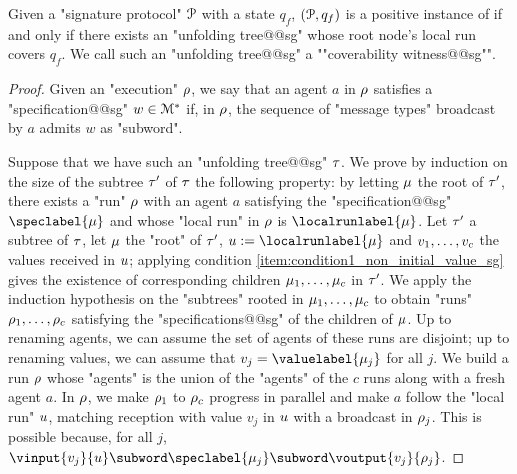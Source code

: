 \begin{lemma}
\label{lem:coverability_witness_sg}
Given a "signature protocol" $\mathcal{P}$ with a state $q_f$, $(\mathcal{P},q_f)$ is a positive instance of \COVER if and only if there exists an "unfolding tree@@sg" whose root node's local run covers $q_f$. We call such an "unfolding tree@@sg" a ""coverability witness@@sg"".
\end{lemma}
\begin{proof}
Given an "execution" $\rho$, we say that an agent $a$ in $\rho$ satisfies a "specification@@sg" $w \in \mathcal{M}^*$ if, in $\rho$, the sequence of "message types" broadcast by $a$ admits $w$ as "subword".%

Suppose that we have such an "unfolding tree@@sg" $\tau$. We prove by induction on the size of the subtree $\tau'$ of $\tau$ the following property: by letting $\mu$ the root of $\tau'$, there exists a "run" $\rho$ with an agent $a$ satisfying the "specification@@sg" $\speclabel{\node}$ and whose "local run" in $\rho$ is $\localrunlabel{\node}$. Let $\tau'$ a subtree of $\tau$, let $\mu$ the "root" of $\tau'$, $\localrun := \localrunlabel{\node}$ and $v_1, \dots, v_c$ the values received in $u$; applying condition \ref{item:condition1_non_initial_value_sg} gives the existence of corresponding children $\mu_1, \dots, \mu_c$ in $\tau'$. We apply the induction hypothesis on the "subtrees" rooted in $\mu_1, \dots, \mu_c$ to obtain "runs" $\rho_1, \dots, \rho_c$ satisfying the "specifications@@sg" of the children of $\mu$. Up to renaming agents, we can assume the set of agents of these runs are disjoint; up to renaming values, we can assume that $\aval_j = \valuelabel{\node_j}$ for all $j$. We build a run $\rho$ whose "agents" is the union of the "agents" of the $c$ runs along with a fresh agent $a$. In $\rho$, we make $\rho_1$ to $\rho_c$ progress in parallel and make $a$ follow the "local run" $u$, matching reception with value $v_j$ in $u$ with a broadcast in $\rho_j$. This is possible because, for all $j$, $\vinput{v_j}{\localrun} \subword \speclabel{\node_j} \subword \voutput{v_j}{\run_j}$. 


\end{proof}
